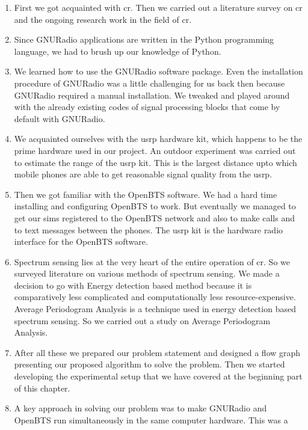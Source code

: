 \begin{enumerate}
    \item First we got acquainted with \gls{cr}. Then we
    carried out a literature survey on \gls{cr} and the ongoing 
    research work in the field of \gls{cr}.
    \item Since GNURadio applications are written in the Python programming 
    language, we had to brush up our knowledge of Python.
    \item We learned how to use the GNURadio software package. Even 
    the installation procedure of GNURadio was a little challenging for us
    back then because GNURadio required a manual installation. We tweaked
    and played around with the already existing codes of signal processing
    blocks that come by default with GNURadio.
    \item We acquainted ourselves with the \gls{usrp} hardware kit, which happens to
    be the prime hardware used in our project. An outdoor experiment was
    carried out to estimate the range of the \gls{usrp} kit. This is the largest 
    distance upto which mobile phones are able to get reasonable signal
    quality from the \gls{usrp}.
    \item Then we got familiar with the OpenBTS software. We had a hard time
    installing and configuring OpenBTS to work. But eventually we managed to 
    get our \glspl{sim} registered to the OpenBTS network and also to make calls and
    to text messages between the phones. The \gls{usrp} kit is the hardware radio 
    interface for the OpenBTS software.
    \item Spectrum sensing lies at the very heart of the entire operation of 
    \gls{cr}. So we surveyed literature on various methods of spectrum
    sensing. We made a decision to go with Energy detection based method 
    because it is comparatively less complicated and computationally less 
    resource-expensive. Average Periodogram Analysis is a technique used in 
    energy detection based spectrum sensing. So we carried out a study on
    Average Periodogram Analysis.
    \item After all these we prepared our problem statement and designed a 
    flow graph presenting our proposed algorithm to solve the problem. Then 
    we started developing the experimental setup that we have covered at the
    beginning part of this chapter.
    \item A key approach in solving our problem was to make GNURadio and 
    OpenBTS run simultaneously in the same computer hardware. This was a

\end{enumerate}
